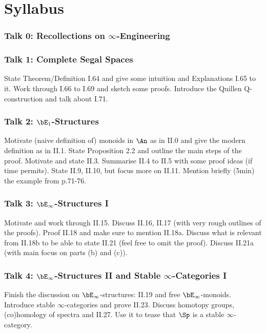 \documentclass{article}
\begin{document}
\section*{Syllabus}

\subsubsection*{Talk 0: Recollections on $\infty$-Engineering}


\subsubsection*{Talk 1: Complete Segal Spaces}
State Theorem/Definition I.64 and give some intuition and
Explanations I.65 to it.
Work through I.66 to I.69 and sketch some proofs.
Introduce the Quillen Q-construction and talk about I.71.

\subsubsection*{Talk 2: $\bE_1$-Structures}
Motivate (naive definition of) monoids in $\An$ as in II.0 and
give the modern definition as in II.1. State Proposition 2.2 and 
outline the main steps of the proof.
Motivate and state II.3. Summarise II.4 to II.5 with some proof ideas
(if time permits). State II.9, II.10, but focus more on II.11.
Mention briefly (5min) the example from p.71-76.


\subsubsection*{Talk 3: $\bE_\infty$-Structures I}
Motivate and work through II.15. Discuss II.16, II.17 (with very rough outlines
of the proofs). Proof II.18 and make sure to mention II.18a.
Discuss what is relevant from II.18b to be able to state II.21
(feel free to omit the proof). Discuss II.21a (with main focus on parts 
(b) and (c)).

\subsubsection*{Talk 4: $\bE_\infty$-Structures II and 
Stable $\infty$-Categories I}
Finish the discussion on $\bE_\infty$-structures: II.19 and free 
$\bE_\infty$-monoids.
Introduce stable $\infty$-categories and prove II.23. Discuss
homotopy groups, (co)homology of spectra and II.27. Use it to 
tease that $\Sp$ is a stable $\infty$-category.
\end{document}
